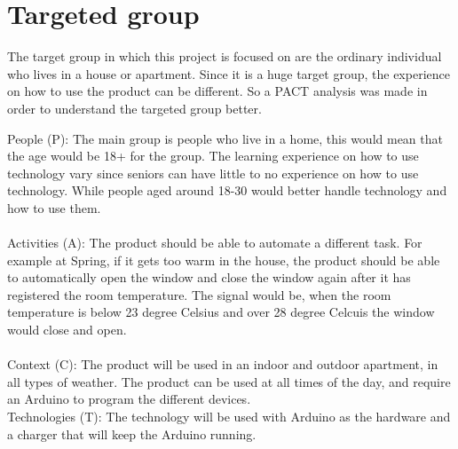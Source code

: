 \section{Targeted group}
\label{targetedGroup}
The target group in which this project is focused on are the ordinary individual who lives in a house or apartment. Since it is a huge target group, the experience on how to use the product can be different. So a PACT analysis was made in order to understand the targeted group better.

People (P): The main group is people who live in a home, this would mean that the age would be 18+ for the group. The learning experience on how to use technology vary since seniors can have little to no experience on how to use technology. While people aged around 18-30 would better handle technology and how to use them. \\
\\
Activities (A): The product should be able to automate a different task. For example at Spring, if it gets too warm in the house, the product should be able to automatically open the window and close the window again after it has registered the room temperature. The signal would be, when the room temperature is below 23 degree Celsius and over 28 degree Celcuis the window would close and open. \\
\\
Context (C): The product will be used in an indoor and outdoor apartment, in all types of weather. The product can be used at all times of the day, and require an Arduino to program the different devices.
\\
Technologies (T): The technology will be used with Arduino as the hardware and a charger that will keep the Arduino running. %
